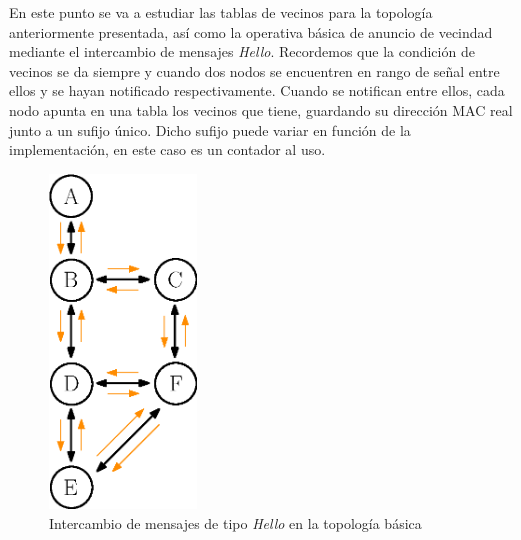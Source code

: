 En este punto se va a estudiar las tablas de vecinos para la topología anteriormente presentada, así como la operativa básica de anuncio de vecindad mediante el intercambio de mensajes \textit{Hello}. Recordemos que la condición de vecinos se da siempre y cuando dos nodos se encuentren en rango de señal entre ellos y se hayan notificado respectivamente. Cuando se notifican entre ellos, cada nodo apunta en una tabla los vecinos que tiene, guardando su dirección MAC real junto a un sufijo único. Dicho sufijo puede variar en función de la implementación, en este caso es un contador al uso.\\


\begin{figure}[ht]
    \centering
    \includegraphics[width=0.35\textwidth]{archivos/img/dev/topo_hellos.eps}
    \caption{Intercambio de mensajes de tipo \textit{Hello} en la topología básica}
    \label{fig:topo_hellos}
\end{figure}

